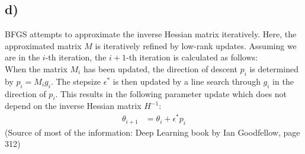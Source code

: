 \documentclass[a4paper]{article}
\begin{document}
\newpage
    \subsection*{d)}
        BFGS attempts to approximate the inverse Hessian matrix iteratively.
        Here, the approximated matrix $M$ is iteratively refined by low-rank updates.
        Assuming we are in the $i$-th iteration, the $i+1$-th iteration is calculated as follows:\\
        When the matrix $M_i$ has been updated, the direction of descent $p_i$ is determined by $p_i = M_i g_i$.
        The stepsize $\epsilon^*$ is then updated by a line search through $g_i$ in the direction of $p_i$. This results in the following parameter update which does not depend on the inverse Hessian matrix $H^{-1}$:
        \begin{align}
            \theta_{i+1} &= \theta_i + \epsilon^* p_i
        \end{align}
        (Source of most of the information: Deep Learning book by Ian Goodfellow, page 312)
\end{document}
